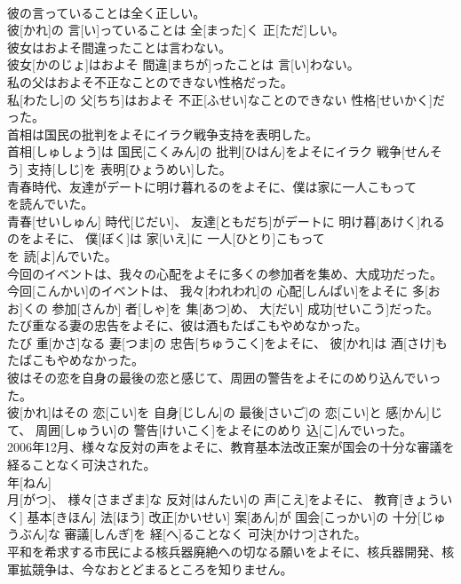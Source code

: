 \documentclass[8pt]{extreport}
\begin{document}
\begin{CJK}{UTF8}{min}
\\	彼の言っていることは全く正しい。	
\\	彼[かれ]の 言[い]っていることは 全[まった]く 正[ただ]しい。
\\	彼女はおよそ間違ったことは言わない。	
\\	彼女[かのじょ]はおよそ 間違[まちが]ったことは 言[い]わない。
\\	私の父はおよそ不正なことのできない性格だった。	
\\	私[わたし]の 父[ちち]はおよそ 不正[ふせい]なことのできない 性格[せいかく]だった。
\\	首相は国民の批判をよそにイラク戦争支持を表明した。	
\\	首相[しゅしょう]は 国民[こくみん]の 批判[ひはん]をよそにイラク 戦争[せんそう] 支持[しじ]を 表明[ひょうめい]した。
\\	青春時代、友達がデートに明け暮れるのをよそに、僕は家に一人こもって
\\	を読んでいた。	
\\	青春[せいしゅん] 時代[じだい]、 友達[ともだち]がデートに 明け暮[あけく]れるのをよそに、 僕[ぼく]は 家[いえ]に 一人[ひとり]こもって 
\\	を 読[よ]んでいた。
\\	今回のイベントは、我々の心配をよそに多くの参加者を集め、大成功だった。	
\\	今回[こんかい]のイベントは、 我々[われわれ]の 心配[しんぱい]をよそに 多[おお]くの 参加[さんか] 者[しゃ]を 集[あつ]め、 大[だい] 成功[せいこう]だった。
\\	たび重なる妻の忠告をよそに、彼は酒もたばこもやめなかった。	
\\	たび 重[かさ]なる 妻[つま]の 忠告[ちゅうこく]をよそに、 彼[かれ]は 酒[さけ]もたばこもやめなかった。
\\	彼はその恋を自身の最後の恋と感じて、周囲の警告をよそにのめり込んでいった。	
\\	彼[かれ]はその 恋[こい]を 自身[じしん]の 最後[さいご]の 恋[こい]と 感[かん]じて、 周囲[しゅうい]の 警告[けいこく]をよそにのめり 込[こ]んでいった。
\\	2006年12月、様々な反対の声をよそに、教育基本法改正案が国会の十分な審議を経ることなく可決された。	
\\	年[ねん] 
\\	月[がつ]、 様々[さまざま]な 反対[はんたい]の 声[こえ]をよそに、 教育[きょういく] 基本[きほん] 法[ほう] 改正[かいせい] 案[あん]が 国会[こっかい]の 十分[じゅうぶん]な 審議[しんぎ]を 経[へ]ることなく 可決[かけつ]された。
\\	平和を希求する市民による核兵器廃絶への切なる願いをよそに、核兵器開発、核軍拡競争は、今なおとどまるところを知りません。	

\end{CJK}
\end{document}
